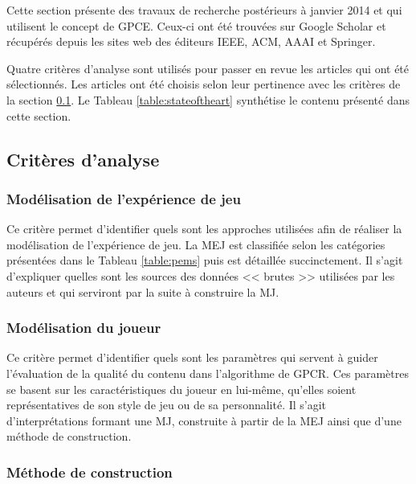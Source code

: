 \documentclass[a4paper,11pt]{article}
\begin{document}
      Cette section présente des travaux de recherche postérieurs à janvier 2014 et qui utilisent le concept de GPCE.
      Ceux-ci ont été trouvées sur Google Scholar et récupérés depuis les sites web des éditeurs IEEE, ACM, AAAI et Springer. 
      
      Quatre critères d'analyse sont utilisés pour passer en revue les articles qui ont été sélectionnés.
      Les articles ont été choisis selon leur pertinence avec les critères de la section \ref{section:criterias}.
      Le Tableau \ref{table:stateoftheart} synthétise le contenu présenté dans cette section.

      \subsection{Critères d'analyse}\label{section:criterias}

      \subsubsection{Modélisation de l'expérience de jeu}

        Ce critère permet d'identifier quels sont les approches utilisées afin de réaliser la modélisation de l'expérience de jeu.
        La MEJ est classifiée selon les catégories présentées dans le Tableau \ref{table:pems} puis est détaillée succinctement. 
        Il s'agit d'expliquer quelles sont les sources des données << brutes >> utilisées par les auteurs et qui serviront par la suite à construire la MJ.

      \subsubsection{Modélisation du joueur}

        Ce critère permet d'identifier quels sont les paramètres qui servent à guider l'évaluation de la qualité du contenu dans l'algorithme de GPCR.
        Ces paramètres se basent sur les caractéristiques du joueur en lui-même, qu'elles soient représentatives de son style de jeu ou de sa personnalité.
        Il s'agit d'interprétations formant une MJ, construite à partir de la MEJ ainsi que d'une méthode de construction.  
        
      \subsubsection{Méthode de construction}
\end{document}
